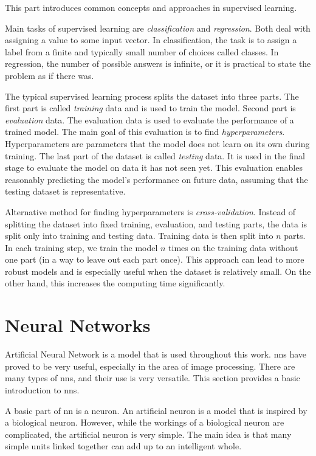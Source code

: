 This part introduces common concepts and approaches in supervised learning.

Main tasks of supervised learning are \textit{classification} and \textit{regression}. Both deal with assigning a value to some input vector. In classification, the task is to assign a label from a finite and typically small number of choices called classes. In regression, the number of possible answers is infinite, or it is practical to state the problem as if there was.

The typical supervised learning process splits the dataset into three parts. The first part is called \textit{training} data and is used to train the model. Second part is \textit{evaluation} data. The evaluation data is used to evaluate the performance of a trained model. The main goal of this evaluation is to find \textit{hyperparameters}. Hyperparameters are parameters that the model does not learn on its own during training. The last part of the dataset is called \textit{testing} data. It is used in the final stage to evaluate the model on data it has not seen yet. This evaluation enables reasonably predicting the model's performance on future data, assuming that the testing dataset is representative.

Alternative method for finding hyperparameters is \textit{cross-validation}. Instead of splitting the dataset into fixed training, evaluation, and testing parts, the data is split only into training and testing data. Training data is then split into $n$ parts. In each training step, we train the model $n$ times on the training data without one part (in a way to leave out each part once). This approach can lead to more robust models and is especially useful when the dataset is relatively small. On the other hand, this increases the computing time significantly.

\section{Neural Networks}
Artificial Neural Network is a model that is used throughout this work. \Glspl{nn} have proved to be very useful, especially in the area of image processing. There are many types of \glspl{nn}, and their use is very versatile. This section provides a basic introduction to \glspl{nn}. 

A basic part of \gls{nn} is a neuron. An artificial neuron is a model that is inspired by a biological neuron. However, while the workings of a biological neuron are complicated, the artificial neuron is very simple. The main idea is that many simple units linked together can add up to an intelligent whole. 

